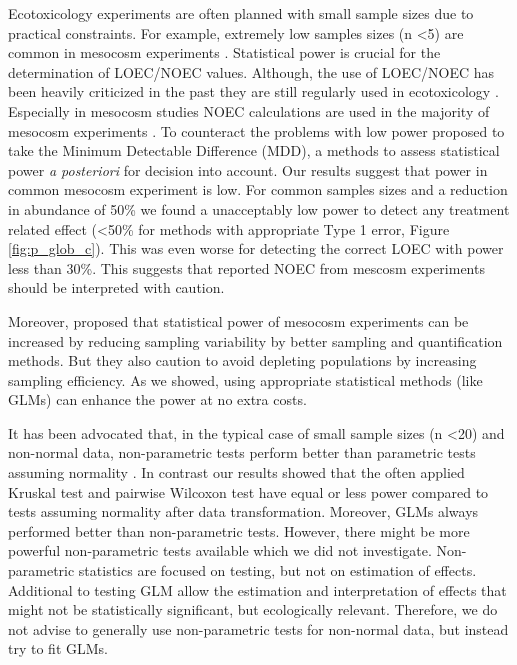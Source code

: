 \documentclass{scrartcl}
\begin{document}
Ecotoxicology experiments are often planned with small sample sizes due to practical constraints. 
For example, extremely low samples sizes (n \textless 5) are common in mesocosm experiments \citep{sanderson_pesticide_2002,szocs_analysing_2015}.
Statistical power is crucial for the determination of LOEC/NOEC values.
Although, the use of LOEC/NOEC has been heavily criticized in the past \citep{landis_well_2011}  they are still regularly used in ecotoxicology \citep{jager_bad_2012}.
Especially in mesocosm studies NOEC calculations are used in the majority of mesocosm experiments \citep{brock_minimum_2014,efsa_ppr_guidance_2013}.
To counteract the problems with low power \citet{brock_minimum_2014} proposed to take the Minimum Detectable Difference (MDD), a methods to assess statistical power \emph{a posteriori} for decision into account.
Our results suggest that power in common mesocosm experiment is low.
For common samples sizes and a reduction in abundance of 50\% we found a unacceptably low power to detect any treatment related effect (\textless 50\% for methods with appropriate Type 1 error, Figure \ref{fig:p_glob_c}).
This was even worse for detecting the correct LOEC with power less than 30\%.
This suggests that reported NOEC from mescosm experiments should be interpreted with caution.

Moreover, \citet{brock_minimum_2014} proposed that statistical power of mesocosm experiments can be increased by reducing sampling variability by better sampling and quantification methods. 
But they also caution to avoid depleting populations by increasing sampling efficiency.
As we showed, using appropriate statistical methods (like GLMs) can enhance the power at no extra costs.

It has been advocated that, in the typical case of small sample sizes (n \textless 20) and non-normal data, non-parametric tests perform better than parametric tests assuming normality \citep{wang_making_2011}.
In contrast our results showed that the often applied Kruskal test and pairwise Wilcoxon test have equal or less power compared to tests assuming normality after data transformation.
Moreover, GLMs always performed better than non-parametric tests. 
However, there might be more powerful non-parametric tests available \citep{konietschke_rank-based_2012} which we did not investigate.
Non-parametric statistics are focused on testing, but not on estimation of effects.
Additional to testing GLM allow the estimation and interpretation of effects that might not be statistically significant, but ecologically relevant.
Therefore, we do not advise to generally use non-parametric tests for non-normal data, but instead try to fit GLMs.
\end{document}
